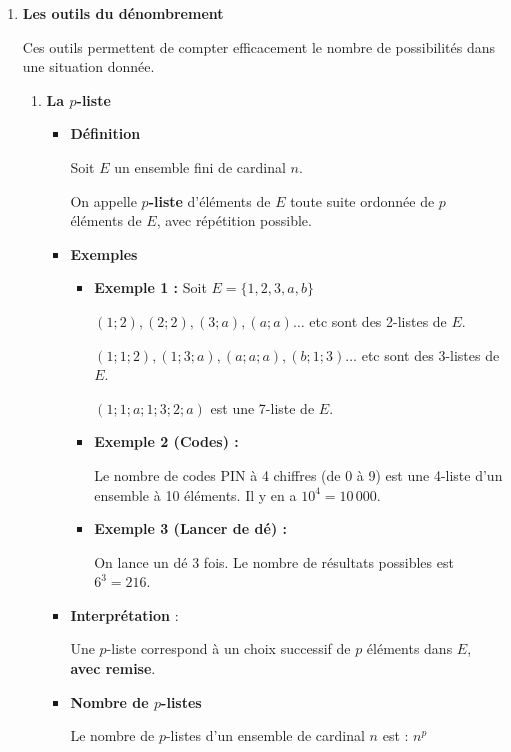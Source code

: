 \documentclass[12pt,a4paper]{article}
\newcounter{solution}
\newcommand{\solution}{
\refstepcounter{solution}
\textbf{\textcolor{orange}{Solution \thesolution : }}
}
\begin{document}
\begin{enumerate}[label=\Roman*., font=\bfseries\color{red}]
\begin{enumerate}
\textbf{\underline{\solution}}  
      
\item \textbf{Les outils du dénombrement} 

Ces outils permettent de compter efficacement le nombre de possibilités dans une situation donnée.

\begin{enumerate}

\item \textbf{La $p$-liste}

\begin{itemize}
    \item \textbf{Définition}

    Soit \( E \) un ensemble fini de cardinal \( n \).

    On appelle \textbf{$p$-liste} d’éléments de \( E \) toute suite ordonnée de \( p \) éléments de \( E \), avec répétition possible.

\item \textbf{Exemples}

\begin{itemize}
    \item \textbf{Exemple 1 :}
    Soit $E = \{1, 2, 3, a, b\}$

$(1; 2), (2; 2), (3; a), (a; a) \dots$ etc sont des 2-listes de $E$.

$(1; 1; 2), (1; 3; a), (a; a; a), (b; 1; 3) \dots$ etc sont des 3-listes de $E$.

$(1; 1; a; 1; 3; 2; a)$ est une 7-liste de $E$.

    \item \textbf{Exemple 2 (Codes) :}
    
     Le nombre de codes PIN à 4 chiffres (de 0 à 9) est une 4-liste d'un ensemble à 10 éléments. Il y en a $10^4 = 10\,000$.
    \item \textbf{Exemple 3 (Lancer de dé) :} 
    
    On lance un dé 3 fois. Le nombre de résultats possibles est $6^3 = 216$.
\end{itemize}

\item \textbf{Interprétation} : 

Une $p$-liste correspond à un choix successif de \( p \) éléments dans \( E \), \textbf{avec remise}.

    \item \textbf{Nombre de $p$-listes}

    Le nombre de $p$-listes d’un ensemble de cardinal \( n \) est :
    \(
    n^p
    \)


\end{itemize}
\end{enumerate}
\end{enumerate}
\end{enumerate}
\end{document}
